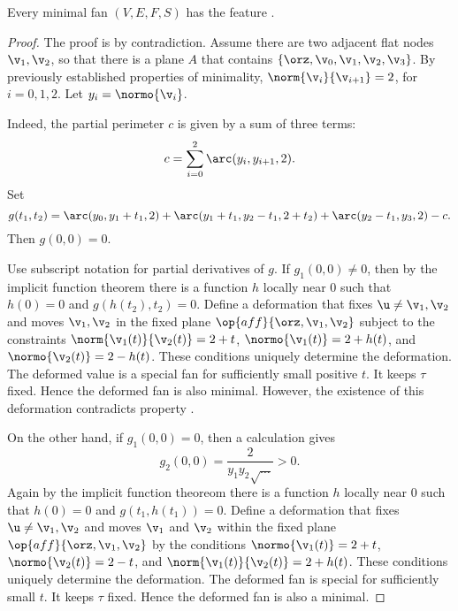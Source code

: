 \begin{lemma}[] 
Every minimal fan $(V,E,F,S)$ has the feature .
\end{lemma}

\begin{proof}  The proof is by contradiction.
Assume there are two adjacent flat nodes $\v_1,\v_2$, so that
there is a plane $A$ that contains $\{\orz,\v_0,\v_1,\v_2,\v_3\}$.
By previously established properties of minimality,
%
$\norm{\v_i}{\v_{i+1}}=2$, for $i=0,1,2$.  Let $y_i = \normo{\v_i}$.
%

  Indeed, the partial
perimeter $c$ is given by a sum of three terms:
\begin{displaymath}
c=\sum_{i=0}^2\arc(y_i,y_{i+1},2).
\end{displaymath}
Set
\begin{displaymath}
  g(t_1,t_2) = \arc(y_0,y_1+t_1,2) 
+ \arc(y_1+t_1,y_2-t_1,2+t_2) + \arc(y_2-t_1,y_3,2) - c.
\end{displaymath}
Then $g(0,0)=0$.  

Use subscript notation for partial derivatives of $g$.  If $g_1(0,0)
\ne 0$, then by the implicit function theorem there is a function $h$
locally near $0$ such that $h(0)=0$ and $g(h(t_2),t_2)=0$.  Define a
deformation that fixes $\u\ne\v_1,\v_2$ and moves $\v_1,\v_2$ in the
fixed plane $\op{aff}\{\orz,\v_1,\v_2\}$ subject to the constraints
$\norm{\v_1(t)}{\v_2(t)}=2+t$, $\normo{\v_1(t)} = 2+h(t)$, and
$\normo{\v_2(t)} = 2-h(t)$.  These conditions uniquely determine the
deformation.  The deformed value is a special fan for sufficiently
small positive $t$.  It keeps $\tau$ fixed.  Hence the deformed fan is
also minimal.  However, the existence of this deformation contradicts
property .

On the other hand, if $ g_1(0,0) =0$, then a calculation gives
\begin{displaymath}g_2(0,0) = \dfrac{2}{y_1y_2\sqrt{\ldots}} >
0.\end{displaymath} Again by the implicit function theoreom there is
a function $h$ locally near $0$ such that $h(0)=0$ and
$g(t_1,h(t_1))=0$.  Define a deformation that fixes $\u\ne \v_1,\v_2$
and moves $\v_1$ and $\v_2$ within the fixed plane
$\op{aff}\{\orz,\v_1,\v_2\}$ by the conditions $\normo{\v_1(t)} = 2 +
t$, $\normo{\v_2(t)} = 2 - t$, and $\norm{\v_1(t)}{\v_2(t)}=2+h(t)$.
These conditions uniquely determine the deformation.  The deformed fan
is special for sufficiently small $t$.  It keeps $\tau$ fixed.  Hence
the deformed fan is also a minimal.


\end{proof}
